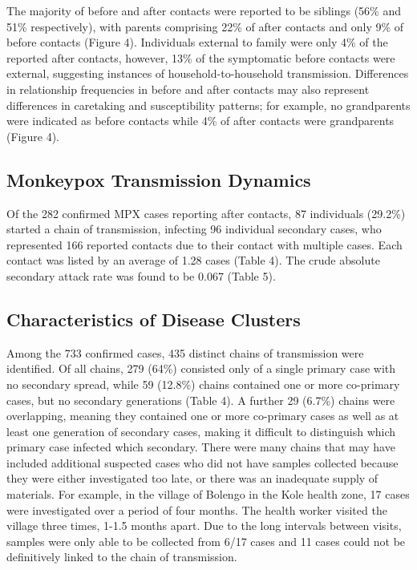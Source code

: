 The majority of before and after contacts were reported to be siblings (56\% and 51\% respectively), with parents comprising 22\% of after contacts and only 9\% of before contacts (Figure 4). Individuals external to family were only 4\% of the reported after contacts, however, 13\% of the symptomatic before contacts were external, suggesting instances of household-to-household transmission. Differences in relationship frequencies in before and after contacts may also represent differences in caretaking and susceptibility patterns; for example, no grandparents were indicated as before contacts while 4\% of after contacts were grandparents (Figure 4).

\subsection{Monkeypox Transmission Dynamics}
Of the 282 confirmed MPX cases reporting after contacts, 87 individuals (29.2\%) started a chain of transmission, infecting 96 individual secondary cases, who represented 166 reported contacts due to their contact with multiple cases. Each contact was listed by an average of 1.28 cases (Table 4). The crude absolute secondary attack rate was found to be 0.067 (Table 5).

\subsection{Characteristics of Disease Clusters}
Among the 733 confirmed cases, 435 distinct chains of transmission were identified. Of all chains, 279 (64\%) consisted only of a single primary case with no secondary spread, while 59 (12.8\%) chains contained one or more co-primary cases, but no secondary generations (Table 4). A further 29 (6.7\%) chains were overlapping, meaning they contained one or more co-primary cases as well as at least one generation of secondary cases, making it difficult to distinguish which primary case infected which secondary. There were many chains that may have included additional suspected cases who did not have samples collected because they were either investigated too late, or there was an inadequate supply of materials. For example, in the village of Bolengo in the Kole health zone, 17 cases were investigated over a period of four months. The health worker visited the village three times, 1-1.5 months apart. Due to the long intervals between visits, samples were only able to be collected from 6/17 cases and 11 cases could not be definitively linked to the chain of transmission.

